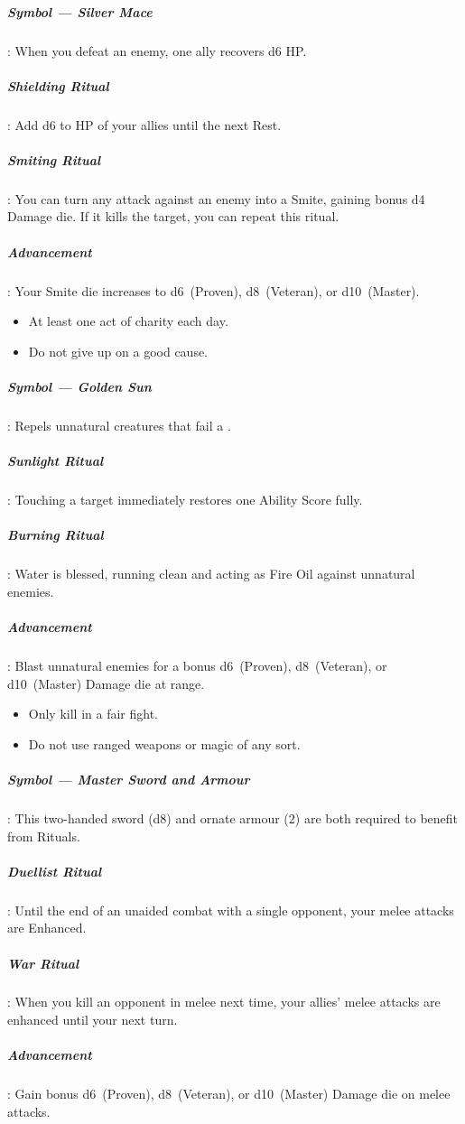 \documentclass[itdr]{subfiles}
\begin{document}
\subparagraph{Symbol --- Silver Mace}: When you defeat an enemy, one ally recovers d6 HP.

\subparagraph{Shielding Ritual}: Add d6 to HP of your allies until the next Rest.

\subparagraph{Smiting Ritual}: You can turn any attack against an enemy into a Smite, gaining bonus d4 Damage die. If it kills the target, you can repeat this ritual.

\subparagraph{Advancement}: Your Smite die increases to d6~(Proven), d8~(Veteran), or d10~(Master).

\vfill
\break

{\em\begin{itemize}
		\item At least one act of charity each day.
		\item Do not give up on a good cause.
\end{itemize}}

\subparagraph{Symbol --- Golden Sun}: Repels unnatural creatures that fail a .

\subparagraph{Sunlight Ritual}: Touching a target immediately restores one Ability Score fully.

\subparagraph{Burning Ritual}: Water is blessed, running clean and acting as Fire Oil against unnatural enemies.

\subparagraph{Advancement}: Blast unnatural enemies for a bonus d6~(Proven), d8~(Veteran), or d10~(Master) Damage die at range.

\vfill

{\em\begin{itemize}
		\item Only kill in a fair fight.
		\item Do not use ranged weapons or magic of any sort.
\end{itemize}}

\subparagraph{Symbol --- Master Sword and Armour}: This two-handed sword (d8) and ornate armour (2) are both required to benefit from Rituals.

\subparagraph{Duellist Ritual}: Until the end of an unaided combat with a single opponent, your melee attacks are Enhanced.

\subparagraph{War Ritual}: When you kill an opponent in melee next time, your allies' melee attacks are enhanced until your next turn.

\subparagraph{Advancement}: Gain bonus d6~(Proven), d8~(Veteran), or d10~(Master) Damage die on melee attacks.
\vfill
\break
\end{document}
